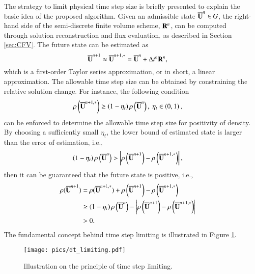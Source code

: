 The strategy to limit physical time step size is briefly presented to explain the basic idea of the proposed algorithm. Given an admissible state $\overline{\mathbf{U}}^n \in G$, the right-hand side of the semi-discrete finite volume scheme, $\mathbf{R}^n$, can be computed through solution reconstruction and flux evaluation, as described in Section \ref{sec:CFV}. The future state can be estimated as
\begin{equation}
    \overline{\mathbf{U}}^{n+1} \approx \overline{\mathbf{U}}^{n+1,*}=\overline{\mathbf{U}}^n + \mathrm\Delta t^n \mathbf{R}^n,
\end{equation}
which is a first-order Taylor series approximation, or in short, a linear approximation. The allowable time step size can be obtained by constraining the relative solution change. For instance, the following condition
\begin{equation}
    \rho \left(\overline{\mathbf{U}}^{n+1,*}\right) \geq \left(1-\eta_t \right) \rho \left(\overline{\mathbf{U}}^n\right), \ \eta_t \in \left(0,1\right),
\end{equation}
can be enforced to determine the allowable time step size for positivity of density. By choosing a sufficiently small $\eta_t$, the lower bound of estimated state is larger than the error of estimation, i.e.,
\begin{equation}
    \left(1-\eta_t \right) \rho \left(\overline{\mathbf{U}}^n\right) > \left|\rho\left(\overline{\mathbf{U}}^{n+1}\right)-\rho\left(\overline{\mathbf{U}}^{n+1,*}\right) \right|,
\end{equation}
then it can be guaranteed that the future state is positive, i.e.,
\begin{equation}
\begin{aligned}
    \rho(\overline{\mathbf{U}}^{n+1}) &= \rho(\overline{\mathbf{U}}^{n+1,*}) + \rho\left(\overline{\mathbf{U}}^{n+1}\right)-\rho\left(\overline{\mathbf{U}}^{n+1,*}\right)  \\
    &\geq \left(1-\eta_t \right) \rho \left(\overline{\mathbf{U}}^n\right) - 
    \left|\rho\left(\overline{\mathbf{U}}^{n+1}\right)-\rho\left(\overline{\mathbf{U}}^{n+1,*}\right) \right| \\
    &>0.
\end{aligned}
\end{equation}
The fundamental concept behind time step limiting is illustrated in Figure \ref{fig:dt_limiting}.

\begin{figure}[htbp!]
    \centering
    \texttt{[image: pics/dt\_limiting.pdf]}
    \caption{Illustration on the principle of time step limiting.}
    \label{fig:dt_limiting}
\end{figure}

